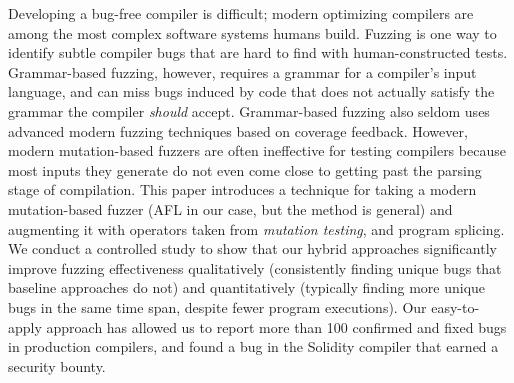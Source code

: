 Developing a bug-free compiler is difficult; modern optimizing compilers are among the most complex software systems humans build.  Fuzzing is one way to identify subtle compiler bugs that are hard to find with human-constructed tests.  Grammar-based fuzzing, however, requires a grammar for a compiler's input language, and can miss bugs induced by code that does not actually satisfy the grammar the compiler \emph{should} accept.  Grammar-based fuzzing also seldom uses advanced modern fuzzing techniques based on coverage feedback. However, modern mutation-based fuzzers are often ineffective for testing compilers because most inputs they generate do not even come close to getting past the parsing stage of compilation.   This paper introduces a technique for taking a modern mutation-based fuzzer (AFL in our case, but the method is general) and augmenting it with operators taken from \emph{mutation testing}, and program splicing. We conduct a controlled study to show that our hybrid approaches significantly improve fuzzing effectiveness qualitatively (consistently finding unique bugs that baseline approaches do not) and quantitatively (typically finding more unique bugs in the same time span, despite fewer program executions). Our easy-to-apply approach has allowed us to report more than 100 confirmed and fixed bugs in production compilers, and found a bug in the Solidity compiler that earned a security bounty.  